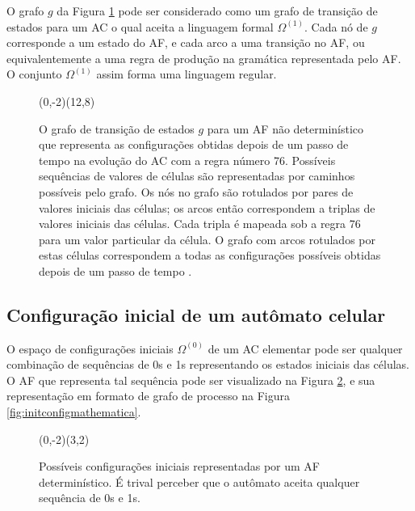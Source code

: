 \documentclass[12pt,a4paper]{article}
\let\vState=\origState
\begin{document}
O grafo $g$ da Figura \ref{fig:A1} pode ser considerado como um grafo
de transição de estados para um AC o qual aceita a linguagem
formal $\Omega^{(1)}$. Cada nó de $g$ corresponde a um estado do
AF, e cada arco a uma transição no AF, ou
equivalentemente a uma regra  de produção na gramática representada pelo
AF. O conjunto $\Omega^{(1)}$ assim forma uma linguagem
regular.

\begin{figure}[H]
\begin{center}
\begin{VCPicture}{(0,-2)(12,8)}
\vState[00]{(0,3)}{A} \vState[01]{(6,6)}{B}
\vState[10]{(6,0)}{C} \vState[11]{(12,3)}{D}
 
 
 
 
\end{VCPicture}
\caption[Grafo de transição de estados]
{O grafo de transição de estados $g$ para um AF
não determinístico que representa as configurações obtidas depois de um passo
de tempo na evolução do AC com a regra número 76.
Possíveis sequências de valores de células são representadas por
caminhos possíveis pelo grafo. Os nós no grafo são rotulados por pares
de valores iniciais das células; os arcos então correspondem a triplas
de valores iniciais das células. Cada tripla é mapeada sob a regra 76
para um valor particular da célula. O grafo com arcos rotulados por estas
células correspondem a todas as configurações possíveis obtidas depois
de um passo de tempo .}
\label{fig:A1}
\end{center}
\end{figure}

\subsection{Configuração inicial de um autômato celular}\label{sec:initcfg}

O espaço de configurações iniciais $\Omega^{(0)}$ de um AC
elementar pode ser qualquer combinação de sequências de 0s e 1s
representando os estados iniciais das células. O AF
que representa tal sequência pode ser visualizado na Figura
\ref{fig:initconfigautomaton}, e sua representação em formato de
grafo de processo na Figura \ref{fig:initconfigmathematica}.

\begin{figure}[H]
\begin{center}
\begin{VCPicture}{(0,-2)(3,2)}
\end{VCPicture}
\caption[Configurações iniciais do AF]
{Possíveis configurações iniciais representadas por um AF
determinístico. É trival perceber que o autômato aceita qualquer sequência de
0s e 1s.}
\label{fig:initconfigautomaton}
\end{center}
\end{figure}
\end{document}
